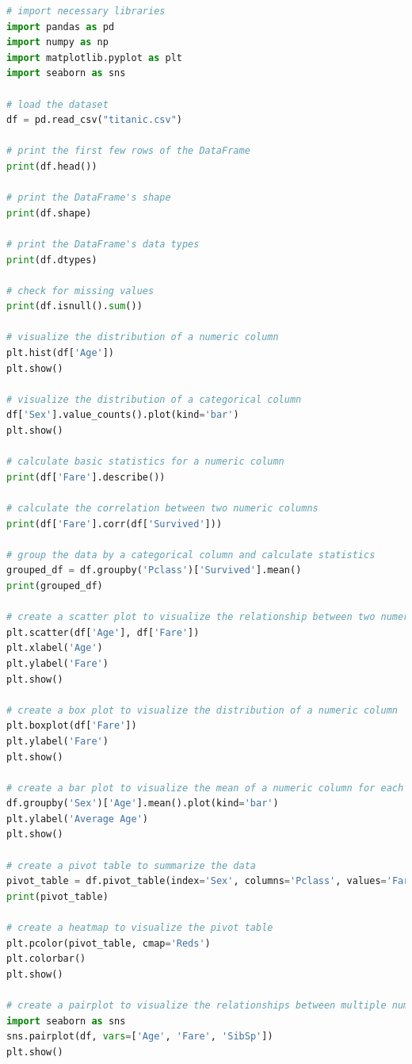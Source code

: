 \documentclass[11pt]{article}
\begin{document}
\begin{mdframed}[backgroundcolor=celadon!6]
\begin{lstlisting}[language=Python]
# import necessary libraries
import pandas as pd
import numpy as np
import matplotlib.pyplot as plt
import seaborn as sns

# load the dataset
df = pd.read_csv("titanic.csv")

# print the first few rows of the DataFrame
print(df.head())

# print the DataFrame's shape
print(df.shape)

# print the DataFrame's data types
print(df.dtypes)

# check for missing values
print(df.isnull().sum())

# visualize the distribution of a numeric column
plt.hist(df['Age'])
plt.show()

# visualize the distribution of a categorical column
df['Sex'].value_counts().plot(kind='bar')
plt.show()

# calculate basic statistics for a numeric column
print(df['Fare'].describe())

# calculate the correlation between two numeric columns
print(df['Fare'].corr(df['Survived']))

# group the data by a categorical column and calculate statistics
grouped_df = df.groupby('Pclass')['Survived'].mean()
print(grouped_df)

# create a scatter plot to visualize the relationship between two numeric columns
plt.scatter(df['Age'], df['Fare'])
plt.xlabel('Age')
plt.ylabel('Fare')
plt.show()

# create a box plot to visualize the distribution of a numeric column
plt.boxplot(df['Fare'])
plt.ylabel('Fare')
plt.show()

# create a bar plot to visualize the mean of a numeric column for each category of a categorical column
df.groupby('Sex')['Age'].mean().plot(kind='bar')
plt.ylabel('Average Age')
plt.show()

# create a pivot table to summarize the data
pivot_table = df.pivot_table(index='Sex', columns='Pclass', values='Fare', aggfunc='mean')
print(pivot_table)

# create a heatmap to visualize the pivot table
plt.pcolor(pivot_table, cmap='Reds')
plt.colorbar()
plt.show()

# create a pairplot to visualize the relationships between multiple numeric columns
import seaborn as sns
sns.pairplot(df, vars=['Age', 'Fare', 'SibSp'])
plt.show()


\end{lstlisting}
\end{mdframed}
\end{document}
